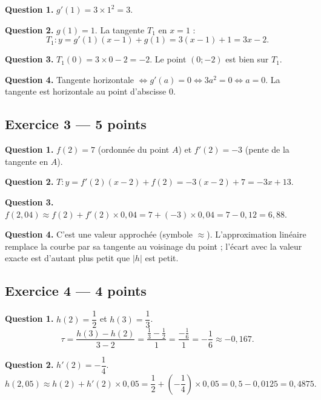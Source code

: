 \textbf{Question 1.}
$g'(1) = 3 \times 1^2 = 3.$

\textbf{Question 2.}
$g(1) = 1$. La tangente $T_1$ en $x=1$ :
\[
T_1 : y = g'(1)(x-1) + g(1) = 3(x-1) + 1 = 3x - 2.
\]

\textbf{Question 3.}
$T_1(0) = 3 \times 0 - 2 = -2$. Le point $(0;-2)$ est bien sur $T_1$. \checkmark

\textbf{Question 4.}
Tangente horizontale $\Leftrightarrow g'(a) = 0 \Leftrightarrow 3a^2 = 0 \Leftrightarrow a = 0$.
La tangente est horizontale au point d'abscisse $0$.

\subsection*{Exercice 3 — 5 points}


\textbf{Question 1.}
$f(2) = 7$ (ordonnée du point $A$) et $f'(2) = -3$ (pente de la tangente en $A$).

\textbf{Question 2.}
$T : y = f'(2)(x-2)+f(2) = -3(x-2)+7 = -3x + 13.$

\textbf{Question 3.}
$f(2{,}04) \approx f(2) + f'(2) \times 0{,}04 = 7 + (-3) \times 0{,}04 = 7 - 0{,}12 = 6{,}88.$

\textbf{Question 4.}
C'est une valeur approchée (symbole $\approx$). L'approximation linéaire remplace la courbe par sa tangente au voisinage du point ; l'écart avec la valeur exacte est d'autant plus petit que $|h|$ est petit.

\subsection*{Exercice 4 — 4 points}


\textbf{Question 1.}
$h(2) = \dfrac{1}{2}$ et $h(3) = \dfrac{1}{3}$.
\[
\tau = \frac{h(3)-h(2)}{3-2} = \frac{\frac{1}{3}-\frac{1}{2}}{1} = \frac{-\frac{1}{6}}{1} = -\frac{1}{6} \approx -0{,}167.
\]

\textbf{Question 2.}
$h'(2) = -\dfrac{1}{4}$.
\[
h(2{,}05) \approx h(2) + h'(2) \times 0{,}05 = \frac{1}{2} + \left(-\frac{1}{4}\right) \times 0{,}05 = 0{,}5 - 0{,}0125 = 0{,}4875.
\]

